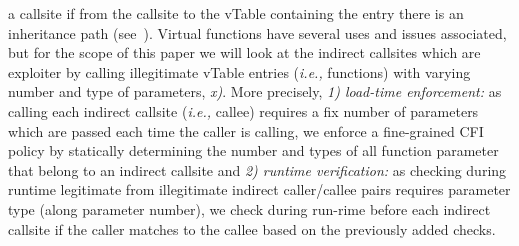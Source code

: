 a callsite if from the callsite to the vTable containing the entry there
is an inheritance path (see~\cite{haller:shrinkwrap}).
Virtual functions have several uses and issues associated, 
but for the scope of this paper we will look at the indirect 
callsites which are exploiter by calling illegitimate vTable entries (\textit{i.e.,} functions)
with varying number and type of parameters, \textit{x)}.
More precisely, 
\textit{1) load-time enforcement:} as calling each indirect callsite (\textit{i.e.,} callee) requires 
a fix number of parameters which are passed each time the caller is calling, we
enforce a fine-grained CFI policy by statically determining the number and types of all function parameter
that belong to an indirect callsite and
\textit{2) runtime verification:} as checking during runtime legitimate from
illegitimate indirect caller/callee pairs requires parameter type (along parameter number),
we check during run-rime before each indirect callsite if the caller matches to the callee 
based on the previously added checks.

